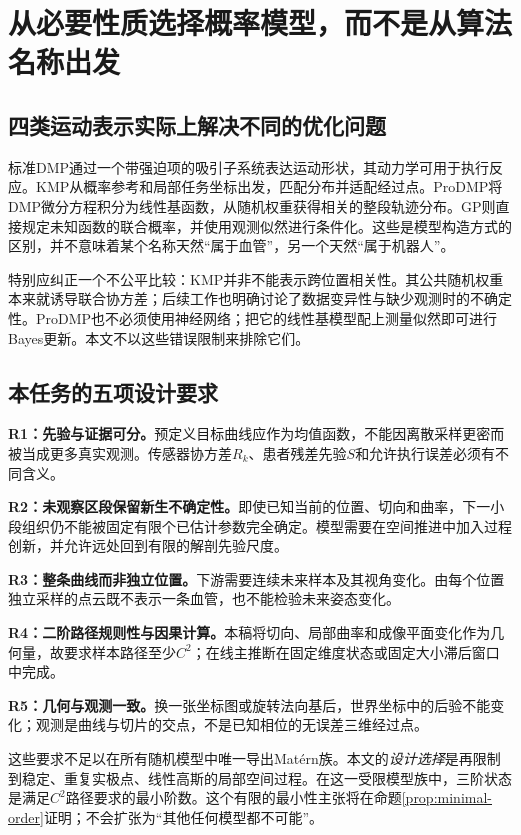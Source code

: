 \documentclass[UTF8,11pt,a4paper,fontset=fandol]{ctexart}
\numberwithin{equation}{section}
\theoremstyle{plain}
\theoremstyle{definition}
\theoremstyle{remark}
\begin{document}
\section{从必要性质选择概率模型，而不是从算法名称出发}\label{sec:selection}
\subsection{四类运动表示实际上解决不同的优化问题}
标准DMP通过一个带强迫项的吸引子系统表达运动形状，其动力学可用于执行反应。KMP从概率参考和局部任务坐标出发，匹配分布并适配经过点。ProDMP将DMP微分方程积分为线性基函数，从随机权重获得相关的整段轨迹分布。GP则直接规定未知函数的联合概率，并使用观测似然进行条件化。这些是模型构造方式的区别，并不意味着某个名称天然“属于血管”，另一个天然“属于机器人”\cite{Huang2019,Li2022,Calinon2020}。

特别应纠正一个不公平比较：KMP并非不能表示跨位置相关性。其公共随机权重本来就诱导联合协方差；后续工作也明确讨论了数据变异性与缺少观测时的不确定性\cite{Silverio2019}。ProDMP也不必须使用神经网络；把它的线性基模型配上测量似然即可进行Bayes更新。本文不以这些错误限制来排除它们。

\subsection{本任务的五项设计要求}
\textbf{R1：先验与证据可分。}预定义目标曲线应作为均值函数，不能因离散采样更密而被当成更多真实观测。传感器协方差$R_k$、患者残差先验$S$和允许执行误差必须有不同含义。

\textbf{R2：未观察区段保留新生不确定性。}即使已知当前的位置、切向和曲率，下一小段组织仍不能被固定有限个已估计参数完全确定。模型需要在空间推进中加入过程创新，并允许远处回到有限的解剖先验尺度。

\textbf{R3：整条曲线而非独立位置。}下游需要连续未来样本及其视角变化。由每个位置独立采样的点云既不表示一条血管，也不能检验未来姿态变化。

\textbf{R4：二阶路径规则性与因果计算。}本稿将切向、局部曲率和成像平面变化作为几何量，故要求样本路径至少$C^2$；在线主推断在固定维度状态或固定大小滞后窗口中完成。

\textbf{R5：几何与观测一致。}换一张坐标图或旋转法向基后，世界坐标中的后验不能变化；观测是曲线与切片的交点，不是已知相位的无误差三维经过点。

这些要求不足以在所有随机模型中唯一导出Mat\'ern族。本文的\emph{设计选择}是再限制到稳定、重复实极点、线性高斯的局部空间过程。在这一受限模型族中，三阶状态是满足$C^2$路径要求的最小阶数。这个有限的最小性主张将在命题\ref{prop:minimal-order}证明；不会扩张为“其他任何模型都不可能”。
\end{document}
